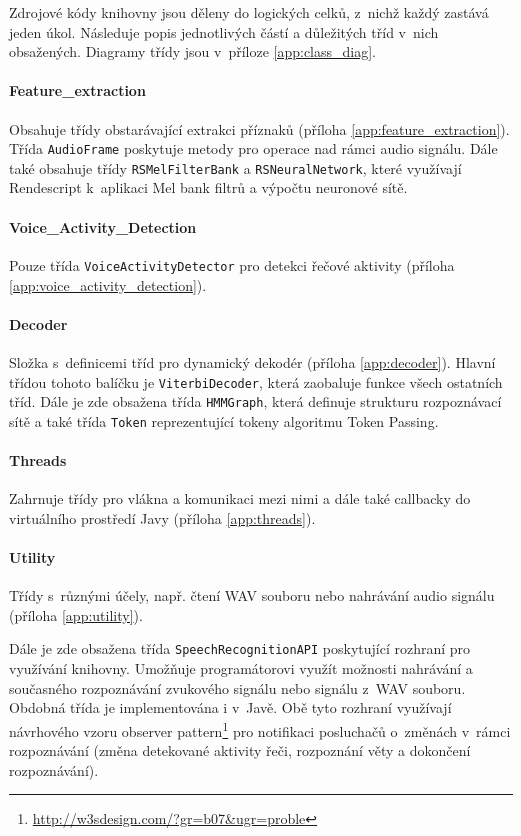 Zdrojové kódy knihovny jsou děleny do logických celků, z~nichž každý zastává jeden úkol. Následuje popis jednotlivých částí a důležitých tříd v~nich obsažených. Diagramy třídy jsou v~příloze \ref{app:class_diag}.

\paragraph{Feature\_extraction} Obsahuje třídy obstarávající extrakci příznaků (příloha \ref{app:feature_extraction}). Třída \texttt{AudioFrame} poskytuje metody pro operace nad rámci audio signálu. Dále také obsahuje třídy \texttt{RSMelFilterBank} a \texttt{RSNeuralNetwork}, které využívají Rendescript k~aplikaci Mel bank filtrů a výpočtu neuronové sítě.

\paragraph{Voice\_Activity\_Detection} Pouze třída \texttt{VoiceActivityDetector} pro detekci řečové aktivity (příloha \ref{app:voice_activity_detection}).

\paragraph{Decoder} Složka s~definicemi tříd pro dynamický dekodér (příloha \ref{app:decoder}). Hlavní třídou tohoto balíčku je \texttt{ViterbiDecoder}, která zaobaluje funkce všech ostatních tříd. Dále je zde obsažena třída \texttt{HMMGraph}, která definuje strukturu rozpoznávací sítě a také třída \texttt{Token} reprezentující tokeny algoritmu Token Passing.

\paragraph{Threads} Zahrnuje třídy pro vlákna a komunikaci mezi nimi a dále také callbacky do virtuálního prostředí Javy (příloha \ref{app:threads}).

\paragraph{Utility} Třídy s~různými účely, např. čtení WAV souboru nebo nahrávání audio signálu (příloha \ref{app:utility}).

Dále je zde obsažena třída \texttt{SpeechRecognitionAPI} poskytující rozhraní pro využívání knihovny. Umožňuje programátorovi využít možnosti nahrávání a současného rozpoznávání zvukového signálu nebo signálu z~WAV souboru. Obdobná třída je implementována i v~Javě. Obě tyto rozhraní využívají návrhového vzoru observer pattern\footnote{\url{http://w3sdesign.com/?gr=b07\&ugr=proble}} pro notifikaci posluchačů o~změnách v~rámci rozpoznávání (změna detekované aktivity řeči, rozpoznání věty a dokončení rozpoznávání).

